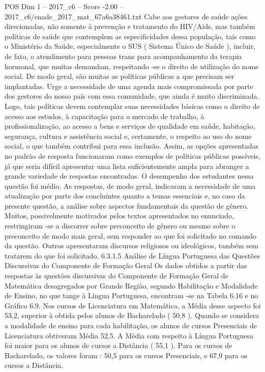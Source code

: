 \begin{textsample}{POS Dim 1 – 2017\_c6 – Score -2.00 – 2017\_c6/enade\_2017\_mat\_67a6a38461.txt}
Cabe aos gestores de saúde ações direcionadas, não somente à prevenção e tratamento do HIV/Aids, mas também políticas de saúde que contemplem as especificidades dessa população, tais como o Ministério da Saúde, especialmente o SUS ( Sistema Único de Saúde ), incluir, de fato, o atendimento para pessoas trans para acompanhamento da terapia hormonal, que muitas demandam, respeitando -se o direito de utilização do nome social.
De modo geral, são muitas as políticas públicas a que precisam ser implantadas.
Urge a necessidade de uma agenda mais compromissada por parte dos gestores do nosso país com essa comunidade, que ainda é muito discriminada.
Logo, tais políticas devem contemplar suas necessidades básicas como o direito de acesso aos estudos, à capacitação para o mercado de trabalho, à profissionalização, ao acesso a bens e serviços de qualidade em saúde, habitação, segurança, cultura e assistência social e, certamente, o respeito ao uso do nome social, o que também contribui para essa inclusão.
Assim, as opções apresentadas no padrão de resposta funcionaram como exemplos de políticas públicas possíveis, já que seria difícil apresentar uma lista suficientemente ampla para abranger a grande variedade de respostas encontradas.
O desempenho dos estudantes nessa questão foi médio.
As respostas, de modo geral, indicaram a necessidade de uma atualização por parte dos concluintes quanto a temas essenciais e, no caso da presente questão, a análise sobre aspectos fundamentais da questão de gênero.
Muitos, possivelmente motivados pelos textos apresentados no enunciado, restringiram -se a discorrer sobre preconceito de gênero ou mesmo sobre o preconceito de modo mais geral, sem responder ao que foi solicitado no comando da questão.
Outros apresentaram discursos religiosos ou ideológicos, também sem tratarem do que foi solicitado. 6.3.1.5 Análise de Língua Portuguesa das Questões Discursivas do Componente de Formação Geral Os dados obtidos a partir das respostas às questões discursivas do Componente de Formação Geral de Matemática desagregados por Grande Região, segundo Habilitação e Modalidade de Ensino, no que tange à Língua Portuguesa, encontram -se na Tabela 6.16 e no Gráfico 6.9.
Nos cursos de Licenciatura em Matemática, a Média desse aspecto foi 53,2, superior à obtida pelos alunos de Bacharelado ( 50,8 ).
Quando se considera a modalidade de ensino para cada habilitação, os alunos de cursos Presenciais de Licenciatura obtiveram Média 52,5.
A Média com respeito à Língua Portuguesa foi maior para os alunos de cursos a Distância ( 55,1 ).
Para os cursos de Bacharelado, os valores foram : 50,5 para os cursos Presenciais, e 67,9 para os cursos a Distância.

\end{textsample}
